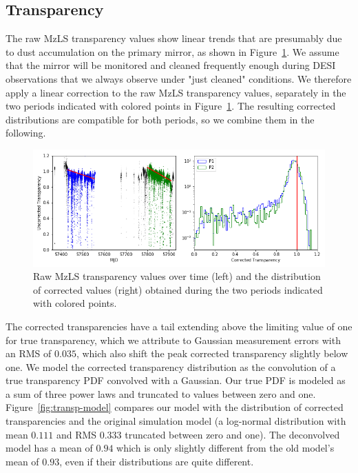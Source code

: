 \documentclass[12pt]{article}
\providecommand{\fig}[1]{Figure~\ref{fig:#1}}
\begin{document}
\subsection{Transparency}

The raw MzLS transparency values show linear trends that are presumably due to dust accumulation on the primary mirror, as shown in \fig{transp-trend}. We assume that the mirror will be monitored and cleaned frequently enough during DESI observations that we always observe under "just cleaned" conditions. We therefore apply a linear correction to the raw MzLS transparency values, separately in the two periods indicated with colored points in \fig{transp-trend}.  The resulting corrected distributions are compatible for both periods, so we combine them in the following.

\begin{figure}[htb]
\begin{center}
\includegraphics[width=\linewidth]{transp-trend}
\caption{Raw MzLS transparency values over time (left) and the distribution of corrected values (right) obtained during the two periods indicated with colored points.}
\label{fig:transp-trend}
\end{center}
\end{figure}

The corrected transparencies have a tail extending above the limiting value of one for true transparency, which we attribute to Gaussian measurement errors with an RMS of $0.035$, which also shift the peak corrected transparency slightly below one.  We model the corrected transparency distribution as the convolution of a true transparency PDF convolved with a Gaussian. Our true PDF is modeled as a sum of three power laws and truncated to values between zero and one. \fig{transp-model} compares our model with the distribution of corrected transparencies and the original simulation model (a log-normal distribution with mean $0.111$ and RMS $0.333$ truncated between zero and one).  The deconvolved model has a mean of $0.94$ which is only slightly different from the old model's mean of $0.93$, even if their distributions are quite different.
\end{document}
